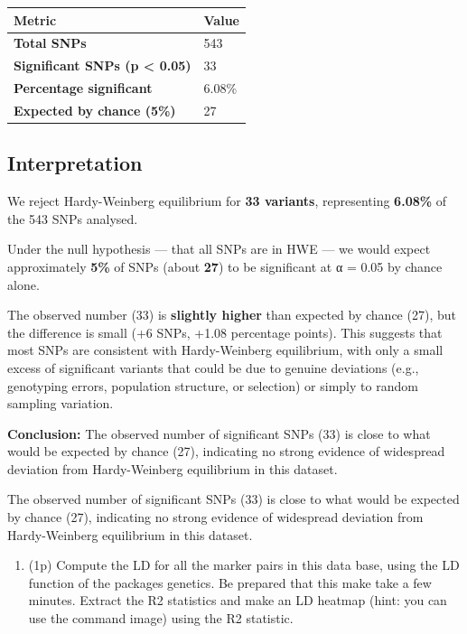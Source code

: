 \documentclass[
]{article}
\newcounter{none} %
\providecommand{\tightlist}{%
  \setlength{\itemsep}{0pt}\setlength{\parskip}{0pt}}
\begin{document}
{\def\LTcaptype{none} %
\begin{longtable}[]{@{}ll@{}}
\toprule\noalign{}
Metric & Value \\
\midrule\noalign{}
\endhead
\bottomrule\noalign{}
\endlastfoot
\textbf{Total SNPs} & 543 \\
\textbf{Significant SNPs (p \textless{} 0.05)} & 33 \\
\textbf{Percentage significant} & 6.08\% \\
\textbf{Expected by chance (5\%)} & 27 \\
\end{longtable}
}

\subsection{Interpretation}\label{interpretation-1}

We reject Hardy-Weinberg equilibrium for \textbf{33 variants},
representing \textbf{6.08\%} of the 543 SNPs analysed.

Under the null hypothesis --- that all SNPs are in HWE --- we would
expect approximately \textbf{5\%} of SNPs (about \textbf{27}) to be
significant at α = 0.05 by chance alone.

The observed number (33) is \textbf{slightly higher} than expected by
chance (27), but the difference is small (+6 SNPs, +1.08 percentage
points). This suggests that most SNPs are consistent with Hardy-Weinberg
equilibrium, with only a small excess of significant variants that could
be due to genuine deviations (e.g., genotyping errors, population
structure, or selection) or simply to random sampling variation.

\textbf{Conclusion:} The observed number of significant SNPs (33) is
close to what would be expected by chance (27), indicating no strong
evidence of widespread deviation from Hardy-Weinberg equilibrium in this
dataset.

The observed number of significant SNPs (33) is close to what would be
expected by chance (27), indicating no strong evidence of widespread
deviation from Hardy-Weinberg equilibrium in this dataset.

\begin{enumerate}
\def\labelenumi{\arabic{enumi}.}
\setcounter{enumi}{4}
\tightlist
\item
  (1p) Compute the LD for all the marker pairs in this data base, using
  the LD function of the packages genetics. Be prepared that this make
  take a few minutes. Extract the R2 statistics and make an LD heatmap
  (hint: you can use the command image) using the R2 statistic.
\end{enumerate}
\end{document}
